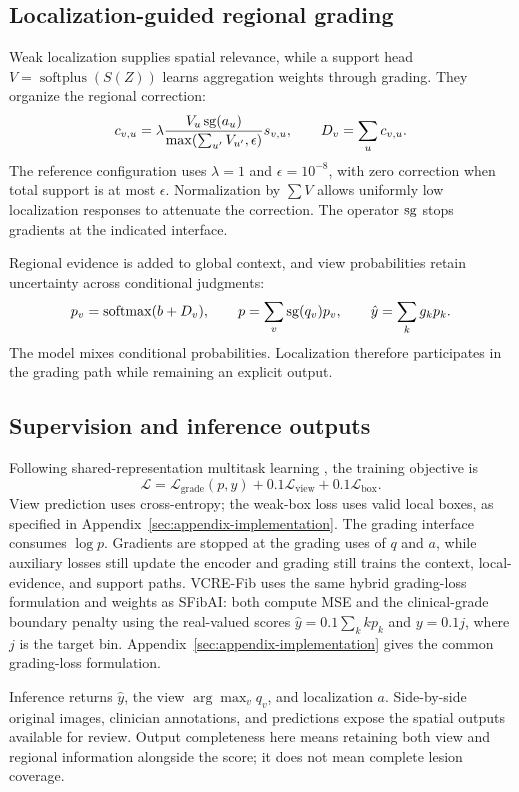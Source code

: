\subsection{Localization-guided regional grading}
Weak localization supplies spatial relevance, while a support head $V=\operatorname{softplus}(S(Z))$ learns aggregation weights through grading. They organize the regional correction:
\begin{equation}
c_{v,u}=\lambda\frac{V_u\operatorname{sg}(a_u)}{\max(\sum_{u'}V_{u'},\epsilon)}s_{v,u},
\qquad D_v=\sum_u c_{v,u}.
\label{eq:regional}
\end{equation}
The reference configuration uses $\lambda=1$ and $\epsilon=10^{-8}$, with zero correction when total support is at most $\epsilon$. Normalization by $\sum V$ allows uniformly low localization responses to attenuate the correction. The operator $\operatorname{sg}$ stops gradients at the indicated interface.

Regional evidence is added to global context, and view probabilities retain uncertainty across conditional judgments:
\begin{equation}
p_v=\operatorname{softmax}(b+D_v),\qquad
p=\sum_v\operatorname{sg}(q_v)p_v,\qquad
\hat y=\sum_k g_kp_k.
\label{eq:mixture}
\end{equation}
The model mixes conditional probabilities. Localization therefore participates in the grading path while remaining an explicit output.

\subsection{Supervision and inference outputs}
Following shared-representation multitask learning \citep{caruana1997multitask}, the training objective is
\begin{equation}
\mathcal L=\mathcal L_{\mathrm{grade}}(p,y)+0.1\mathcal L_{\mathrm{view}}+0.1\mathcal L_{\mathrm{box}}.
\label{eq:loss}
\end{equation}
View prediction uses cross-entropy; the weak-box loss uses valid local boxes, as specified in Appendix~\ref{sec:appendix-implementation}. The grading interface consumes $\log p$. Gradients are stopped at the grading uses of $q$ and $a$, while auxiliary losses still update the encoder and grading still trains the context, local-evidence, and support paths. VCRE-Fib uses the same hybrid grading-loss formulation and weights as SFibAI: both compute MSE and the clinical-grade boundary penalty using the real-valued scores $\hat y=0.1\sum_k kp_k$ and $y=0.1j$, where $j$ is the target bin. Appendix~\ref{sec:appendix-implementation} gives the common grading-loss formulation.

Inference returns $\hat y$, the view $\arg\max_v q_v$, and localization $a$. Side-by-side original images, clinician annotations, and predictions expose the spatial outputs available for review. Output completeness here means retaining both view and regional information alongside the score; it does not mean complete lesion coverage.
